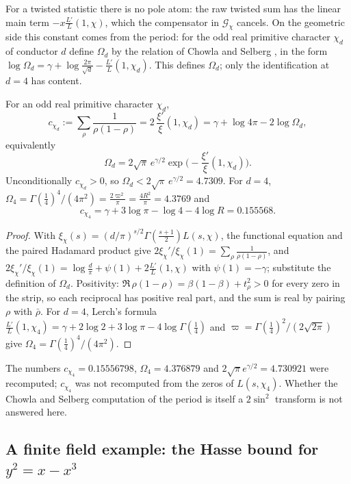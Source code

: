 For a twisted statistic there is no pole atom: the raw twisted sum has the linear main term $-x\frac{L'}{L}(1,\chi)$, which the compensator in $\mathcal G_\chi$ cancels. On the geometric side this constant comes from the period: for the odd real primitive character $\chi_{d}$ of conductor $d$ define $\Omega_d$ by the relation of Chowla and Selberg \cite{ChowlaSelberg67}, in the form $\log\Omega_d=\gamma+\log\frac{2\pi}{\sqrt d}-\frac{L'}{L}(1,\chi_{d})$. This defines $\Omega_d$; only the identification at $d=4$ has content.

\begin{theorem}\label{mql:thm:period}
For an odd real primitive character $\chi_{d}$,
\[
c_{\chi_{d}}:=\sum_\rho\frac{1}{\rho(1-\rho)}=2\,\frac{\xi'}{\xi}(1,\chi_{d})=\gamma+\log4\pi-2\log\Omega_d ,
\]
equivalently
\[
\Omega_d=2\sqrt\pi\,e^{\gamma/2}\exp\Big(-\frac{\xi'}{\xi}(1,\chi_{d})\Big).
\]
Unconditionally $c_{\chi_{d}}>0$, so $\Omega_d<2\sqrt\pi\,e^{\gamma/2}=4.7309$. For $d=4$, $\Omega_4=\Gamma(\frac14)^4/(4\pi^2)=\frac{2\varpi^2}{\pi}=\frac{4R^2}\pi=4.3769$ and
\[
c_{\chi_{4}}=\gamma+3\log\pi-\log4-4\log R=0.155568 .
\]
\end{theorem}

\begin{proof}
With $\xi_\chi(s)=(d/\pi)^{s/2}\Gamma(\frac{s+1}2)L(s,\chi)$, the functional equation and the paired Hadamard product give $2\xi_\chi'/\xi_\chi(1)=\sum_\rho\frac1{\rho(1-\rho)}$, and $2\xi_\chi'/\xi_\chi(1)=\log\frac d\pi+\psi(1)+2\frac{L'}L(1,\chi)$ with $\psi(1)=-\gamma$; substitute the definition of $\Omega_d$. Positivity: $\Re\,\rho(1-\rho)=\beta(1-\beta)+t_\rho^2>0$ for every zero in the strip, so each reciprocal has positive real part, and the sum is real by pairing $\rho$ with $\bar\rho$. For $d=4$, Lerch's formula $\frac{L'}{L}(1,\chi_{4})=\gamma+2\log2+3\log\pi-4\log\Gamma(\frac14)$ and $\varpi=\Gamma(\frac14)^2/(2\sqrt{2\pi})$ give $\Omega_4=\Gamma(\frac14)^4/(4\pi^2)$.
\end{proof}

The numbers $c_{\chi_{4}}=0.15556798$, $\Omega_4=4.376879$ and $2\sqrt\pi e^{\gamma/2}=4.730921$ were recomputed; $c_{\chi_{4}}$ was not recomputed from the zeros of $L(s,\chi_{4})$. Whether the Chowla and Selberg computation of the period is itself a $2\sin^2$ transform is not answered here.

\subsection{A finite field example: the Hasse bound for $y^2=x-x^3$}\label{mql:sub:ffq}

